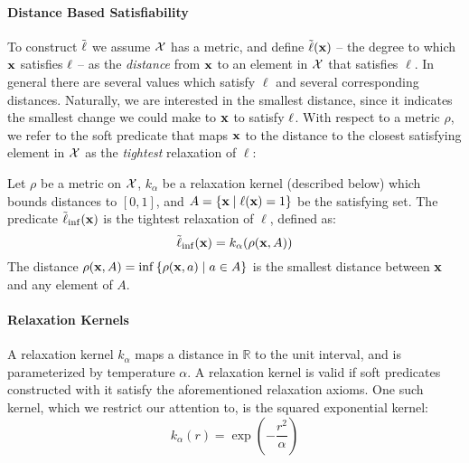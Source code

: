 \paragraph{Distance Based Satisfiability}
To construct $\mathrel{\tilde{\operatorname{\ell}}}$ we assume ${\mathcal{X}}$ has a metric, and define $\tilde{\operatorname{\ell}}(\mathbf{x})$ -- the degree to which $\mathbf{x}$ satisfies $\operatorname{\ell}$ -- as the \emph{distance} from $\mathbf{x}$ to an element in ${\mathcal{X}}$ that satisfies $\ell$.
In general there are several values which satisfy $\ell$ and several corresponding distances.
Naturally, we are interested in the smallest distance, since it indicates the smallest change we could make to $\mathbf{x}$ to satisfy $\operatorname{\ell}$.
With respect to a metric $\rho$, we refer to the soft predicate that maps $\mathbf{x}$ to the distance to the closest satisfying element in ${\mathcal{X}}$ as the \emph{tightest} relaxation of $\ell$:

\begin{definition}
Let $\rho$ be a metric on ${\mathcal{X}}$, $k_\alpha$ be a relaxation kernel (described below) which bounds distances to $[0, 1]$, and $A = \{\mathbf{x} \mid \operatorname{\ell}(\mathbf{x}) = 1\}$ be the satisfying set.
The predicate $\tilde{\operatorname{\ell}}_{\inf}(\mathbf{x})$ is the tightest relaxation of $\ell$, defined as:
\begin{equation}\label{eq;linf}
\tilde{\operatorname{\ell}}_{\inf}(\mathbf{x}) = k_\alpha(\rho(\mathbf{x}, A))
\end{equation}
The distance $\rho(\mathbf{x}, A) = \inf \left\{\rho(\mathbf{x}, a) \mid a \in A\right\}$ is the smallest distance between $\mathbf{x}$ and any element of $A$.
\end{definition}



\paragraph{Relaxation Kernels}A relaxation kernel $k_\alpha$ maps a distance in $\mathbb{R}$ to the unit interval, and is parameterized by temperature $\alpha$.
A relaxation kernel is valid if soft predicates constructed with it satisfy the aforementioned relaxation axioms.
One such kernel, which we restrict our attention to, is the squared exponential kernel:
\begin{equation}
k_{\alpha}(r) = \exp\left(-\frac{r^2}{\alpha}\right)
\end{equation}





